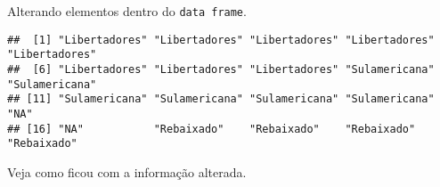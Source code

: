 \documentclass[
]{book}
\newenvironment{Shaded}{\begin{snugshade}}{\end{snugshade}}
\newcommand{\CommentTok}[1]{\textcolor[rgb]{0.56,0.35,0.01}{\textit{#1}}}
\newcommand{\FloatTok}[1]{\textcolor[rgb]{0.00,0.00,0.81}{#1}}
\newcommand{\NormalTok}[1]{#1}
\newcommand{\OtherTok}[1]{\textcolor[rgb]{0.56,0.35,0.01}{#1}}
\newcommand{\SpecialCharTok}[1]{\textcolor[rgb]{0.00,0.00,0.00}{#1}}
\newcommand{\StringTok}[1]{\textcolor[rgb]{0.31,0.60,0.02}{#1}}
\begin{document}
Alterando elementos dentro do \texttt{data\ frame}.

\begin{Shaded}
\end{Shaded}

\begin{verbatim}
##  [1] "Libertadores" "Libertadores" "Libertadores" "Libertadores" "Libertadores"
##  [6] "Libertadores" "Libertadores" "Libertadores" "Sulamericana" "Sulamericana"
## [11] "Sulamericana" "Sulamericana" "Sulamericana" "Sulamericana" "NA"          
## [16] "NA"           "Rebaixado"    "Rebaixado"    "Rebaixado"    "Rebaixado"
\end{verbatim}

\begin{Shaded}
\end{Shaded}

Veja como ficou com a informação alterada.
\end{document}
